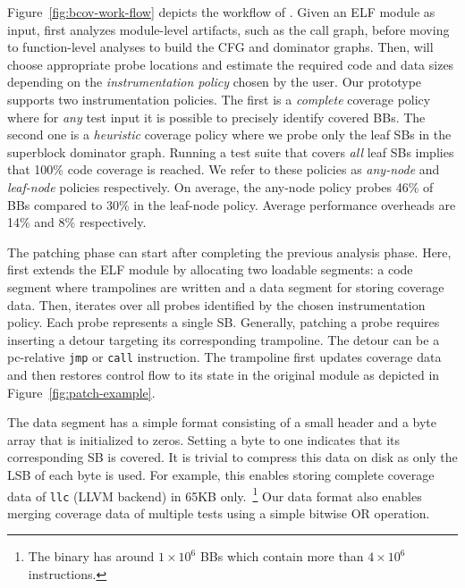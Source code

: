 Figure~\ref{fig:bcov-work-flow} depicts the workflow of {\bcov}.
Given an ELF module as input, {\bcov} first analyzes module-level artifacts, such as the call graph, before moving to function-level analyses to build the CFG and dominator graphs.
Then, {\bcov} will choose appropriate probe locations and estimate the required code and data sizes depending on the \textit{instrumentation policy} chosen by the user.
Our prototype supports two instrumentation policies.
The first is a \textit{complete} coverage policy where for \textit{any} test input it is possible to precisely identify covered BBs. 
The second one is a \textit{heuristic} coverage policy where we probe only the leaf SBs in the superblock dominator graph.
Running a test suite that covers \textit{all} leaf SBs implies that 100\% code coverage is reached. 
We refer to these policies as \textit{any-node} and \textit{leaf-node} policies respectively.
On average, the any-node policy probes 46\% of BBs compared to 30\% in the leaf-node policy.
Average performance overheads are 14\% and 8\% respectively.



The patching phase can start after completing the previous analysis phase.
Here, {\bcov} first extends the ELF module by allocating two loadable segments: a code segment where trampolines are written and a data segment for storing coverage data.
Then, {\bcov} iterates over all probes identified by the chosen instrumentation policy.
Each probe represents a single SB. 
Generally, patching a probe requires inserting a detour targeting its corresponding trampoline.
The detour can be a pc-relative \texttt{jmp} or \texttt{call} instruction.
The trampoline first updates coverage data and then restores control flow to its state in the original module as depicted in Figure~\ref{fig:patch-example}.

The data segment has a simple format consisting of a small header and a byte array that is initialized to zeros. 
Setting a byte to one indicates that its corresponding SB is covered. 
It is trivial to compress this data on disk as only the LSB of each byte is used.
For example, this enables storing complete coverage data of \texttt{llc} (LLVM backend) in 65KB only.~\footnote{The binary has around $1\times10^6$ BBs which contain more than $4\times10^6$ instructions.}
Our data format also enables merging coverage data of multiple tests using a simple bitwise OR operation.

